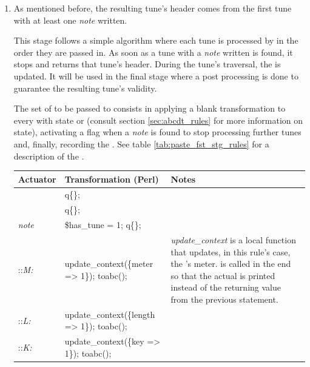 \begin{enumerate}
\item As mentioned before, the resulting tune's header comes from the first tune with at least
one \emph{note} written.

This stage follows a simple algorithm where each tune is processed by \dt{} in the order they are
passed in. As soon as a tune with a \emph{note} written is found, it stops and returns that tune's
header. During the tune's traversal, the \context{} is updated. It will be used in the final stage
where a post processing is done to guarantee the resulting tune's validity.

The set of \abcdtrules{} to be passed to \dt{} consists in applying a blank transformation to every
\abcelement{} with state \intune{} or \inline{} (consult section \ref{sec:abcdt_rules} for more
information on state), activating a flag when a \emph{note} is found to stop processing further
tunes and, finally, recording the \context{}. See table \ref{tab:paste_fst_stg_rules} for a
description of the \abcdtrules{}.

\begin{center}
  \begin{table}[h]
    \begin{tabular}{|p{2.25cm}|p{7.25cm}|p{5cm}|}
      \hline
      Actuator & Transformation (Perl) & Notes\\
      \hline
      \hline
      \intune{} & q\{\}; &
      \\
      \hline

      \hline
      \inline{} & q\{\}; &
      \\
      \hline

      \hline
      \emph{note} & \$has\_tune = 1; q\{\}; &
      \\
      \hline

      \hline
      \inheader{}::\emph{M:} & update\_context(\{meter => 1\}); toabc(); & \emph{update\_context} is
      a local function that updates, in this rule's case, the \context{}'s meter. \toabc{} is called
      in the end so that the actual \abcelement{} is printed instead of the returning value from the
      previous statement.
      \\
      \hline

      \hline
      \inheader{}::\emph{L:} & update\_context(\{length => 1\}); toabc(); &
      \\
      \hline

      \hline
      \inheader{}::\emph{K:} & update\_context(\{key => 1\}); toabc(); &
      \\
      \hline


\end{tabular}
\end{table}
\end{center}
\end{enumerate}

